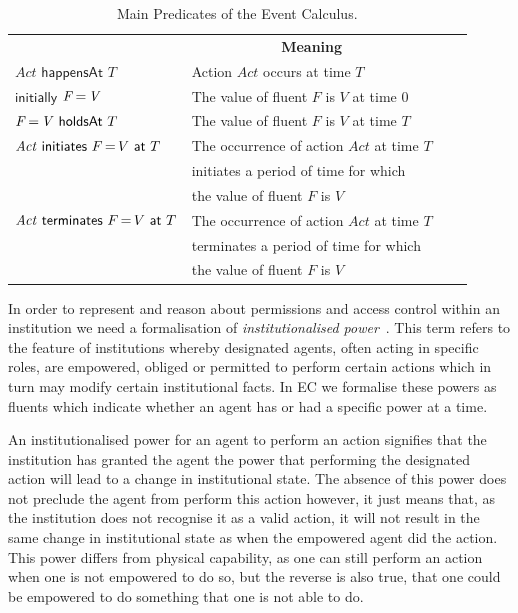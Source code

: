 \begin{table}[htbp]
\caption{Main Predicates  of the Event Calculus.}\label{table:ec}
\begin{center}
\renewcommand{\arraystretch}{0.9}
\setlength\tabcolsep{3pt}
\begin{tabular}{llcc}
\hline\noalign{\smallskip}
\multicolumn{1}{c}{\textbf{Predicate}} & \multicolumn{1}{c}{\textbf{Meaning}}  \\
\noalign{\smallskip}
\hline
\noalign{\smallskip}
$\mathit{Act} \,\, \mathsf{happensAt} \,\, T $ & Action $\mathit{Act}$ occurs at time $T$  \\[2pt]
$\mathsf{initially}$ $\mathit{F \operatorname{=} V}$ & The value of fluent $F$ is $V$ at time $0$  \\[2pt] 
$\mathit{F \operatorname{=} V} \,\, \mathsf{holdsAt} \,\, T$ & The value of fluent $F$ is $V$ at time $T$ 
\\[2pt] 
$\mathit{Act} \,\, \mathsf{initiates} \,\, F \operatorname{=} V \,\, \mathsf{at} \,\, T$ & The occurrence of action $\mathit{Act}$ at time $T$ \\ 
& initiates a period of time for which \\
& the value of fluent $F$ is $V$ \\[2pt] 
$\mathit{Act} \,\, \mathsf{terminates} \,\, F \operatorname{=} V \,\, \mathsf{at} \,\, T$ & The occurrence of action $\mathit{Act}$ at time $T$ \\
& terminates a period of time for which \\
& the value of fluent $F$ is $V$  \\
\hline
\end{tabular}
\end{center}
\end{table}

In order to represent and reason about permissions and access control within an institution we need a formalisation of \emph{institutionalised power}~\citep{Jones1996}. 
This term refers to the feature of institutions whereby designated agents, often acting in specific roles, are empowered, obliged or permitted to perform certain actions which in turn may modify certain institutional facts. 
In \ac{EC} we formalise these powers as fluents which indicate whether an agent has or had a specific power at a time.

An institutionalised power for an agent to perform an action signifies that
the institution has granted the agent the power that performing the designated
action will lead to a change in institutional state. The absence of this power
does not preclude the agent from perform this action however, it just means
that, as the institution does not recognise it as a valid action, it will not
result in the same change in institutional state as when the empowered agent
did the action. This power differs from physical capability, as one can still
perform an action when one is not empowered to do so, but the reverse is also
true, that one could be empowered to do something that one is not able to do.

